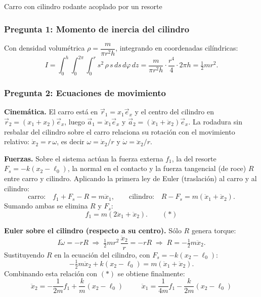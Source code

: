 \begin{solucion}{Carro con cilindro rodante acoplado por un resorte}
\subsubsection*{Pregunta 1: Momento de inercia del cilindro}

Con densidad volumétrica $\rho=\dfrac{m}{\pi r^2 h}$, integrando en coordenadas cilíndricas:
$$I = \int_0^h\!\!\int_0^{2\pi}\!\!\int_0^r s^2\,\rho\,s\,ds\,d\varphi\,dz
= \frac{m}{\pi r^2 h}\cdot\frac{r^4}{4}\cdot 2\pi h = \boxed{\tfrac12 mr^2}.$$

\subsubsection*{Pregunta 2: Ecuaciones de movimiento}

\textbf{Cinemática.} El carro está en $\vec{r}_1=x_1\vec{e}_x$ y el centro del cilindro en
$\vec{r}_2=(x_1+x_2)\vec{e}_x$, luego $\vec{a}_1=\ddot{x}_1\vec{e}_x$ y
$\vec{a}_2=(\ddot{x}_1+\ddot{x}_2)\vec{e}_x$. La rodadura sin resbalar del cilindro sobre el
carro relaciona su rotación con el movimiento relativo: $\dot{x}_2 = r\,\omega$, es decir
$\omega=\dot{x}_2/r$ y $\dot\omega=\ddot{x}_2/r$.

\textbf{Fuerzas.} Sobre el sistema actúan la fuerza externa $f_1$, la del resorte
$F_s=-k(x_2-\ell_0)$, la normal en el contacto y la fuerza tangencial (de roce) $R$ entre carro
y cilindro. Aplicando la primera ley de Euler (traslación) al carro y al cilindro:
$$\text{carro:}\quad f_1 + F_s - R = m\ddot{x}_1,\qquad
\text{cilindro:}\quad R - F_s = m(\ddot{x}_1+\ddot{x}_2).$$
Sumando ambas se elimina $R$ y $F_s$:
$$f_1 = m(2\ddot{x}_1 + \ddot{x}_2). \qquad (\ast)$$

\textbf{Euler sobre el cilindro (respecto a su centro).} Sólo $R$ genera torque:
$$I\dot\omega = -rR \;\Longrightarrow\; \tfrac12 mr^2\,\frac{\ddot{x}_2}{r} = -rR
\;\Longrightarrow\; R = -\tfrac12 m\ddot{x}_2.$$
Sustituyendo $R$ en la ecuación del cilindro, con $F_s=-k(x_2-\ell_0)$:
$$-\tfrac12 m\ddot{x}_2 + k(x_2-\ell_0) = m(\ddot{x}_1+\ddot{x}_2).$$
Combinando esta relación con $(\ast)$ se obtiene finalmente:
$$\boxed{\;\ddot{x}_2 = -\frac{1}{2m}f_1 + \frac{k}{m}(x_2-\ell_0)\;}\qquad
\boxed{\;\ddot{x}_1 = \frac{1}{4m}f_1 - \frac{k}{2m}(x_2-\ell_0)\;}$$
\end{solucion}
